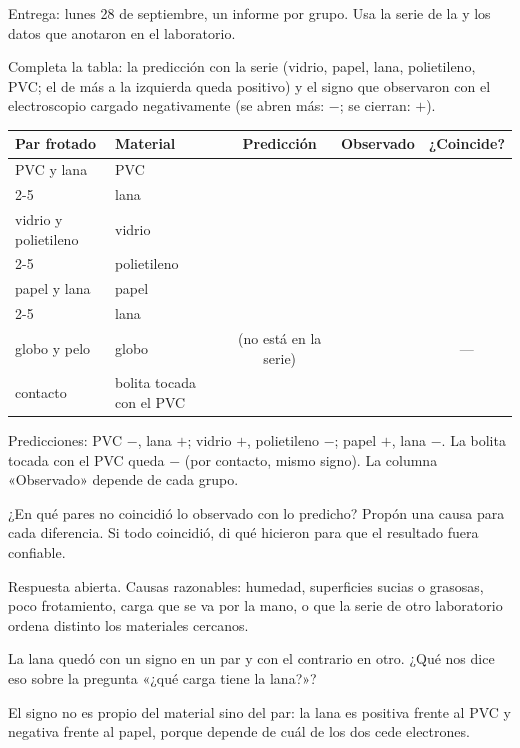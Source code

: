\documentclass[11pt]{article}
\begin{document}
\encabezado

\begin{instrucciones}
Entrega: lunes 28 de septiembre, un informe por grupo. Usa la serie de la
 y los datos que anotaron en el laboratorio.
\end{instrucciones}

\begin{preguntas}

\pregunta Completa la tabla: la predicción con la serie (vidrio, papel, lana, polietileno,
PVC; el de más a la izquierda queda positivo) y el signo que observaron con el electroscopio
cargado negativamente (se abren más: $-$; se cierran: $+$).
\begin{center}
{\renewcommand{\arraystretch}{1.5}
\begin{tabular}{|p{3.2cm}|p{3.8cm}|c|c|c|}
  \hline
  \textbf{Par frotado} & \textbf{Material} & \textbf{Predicción} & \textbf{Observado} &
    \textbf{¿Coincide?}\\\hline
  PVC y lana & PVC & & & \\\cline{2-5}
             & lana & & & \\\hline
  vidrio y polietileno & vidrio & & & \\\cline{2-5}
             & polietileno & & & \\\hline
  papel y lana & papel & & & \\\cline{2-5}
             & lana & & & \\\hline
  globo y pelo & globo & (no está en la serie) & & --- \\\hline
  contacto & bolita tocada con el PVC & & & \\\hline
\end{tabular}}
\end{center}
\begin{solucion}
Predicciones: PVC $-$, lana $+$; vidrio $+$, polietileno $-$; papel $+$, lana $-$. La bolita
tocada con el PVC queda $-$ (por contacto, mismo signo). La columna «Observado» depende de
cada grupo.
\end{solucion}

\pregunta ¿En qué pares no coincidió lo observado con lo predicho? Propón una causa para
cada diferencia. Si todo coincidió, di qué hicieron para que el resultado fuera confiable.
\begin{solucion}
Respuesta abierta. Causas razonables: humedad, superficies sucias o grasosas, poco
frotamiento, carga que se va por la mano, o que la serie de otro laboratorio ordena distinto
los materiales cercanos.
\end{solucion}

\pregunta La lana quedó con un signo en un par y con el contrario en otro. ¿Qué nos dice eso
sobre la pregunta «¿qué carga tiene la lana?»?
\begin{solucion}
El signo no es propio del material sino del par: la lana es positiva frente al PVC y
negativa frente al papel, porque depende de cuál de los dos cede electrones.
\end{solucion}

\end{preguntas}
\end{document}
